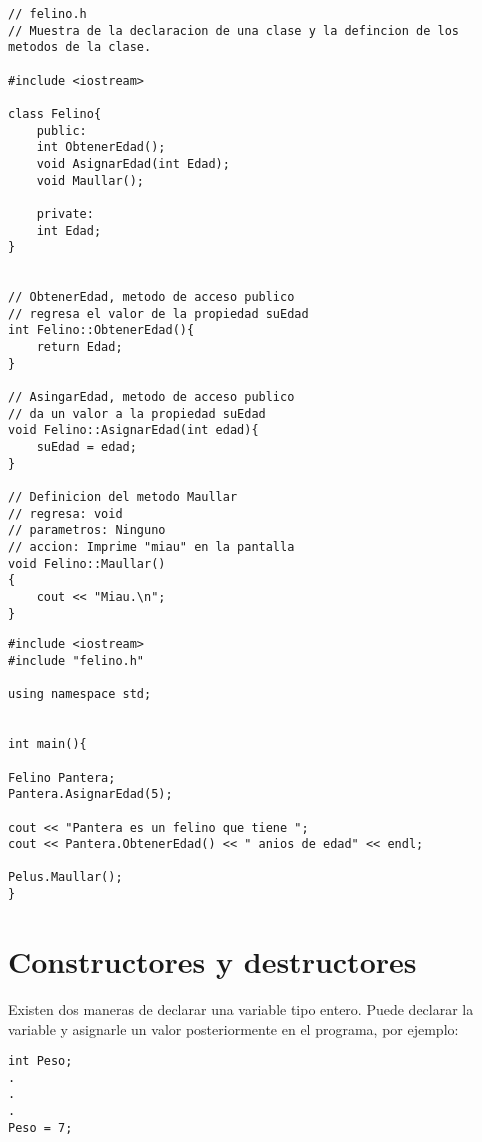 \documentclass[12pt]{extarticle}
\newcommand{\<}{\langle}
\renewcommand{\>}{\rangle}
\theoremstyle{definition}
\begin{document}
\begin{lstlisting}[caption={Archivo donde se encuentra la definición y la implementación de la clase, felino.h},captionpos=b]
// felino.h
// Muestra de la declaracion de una clase y la defincion de los metodos de la clase.

#include <iostream> 

class Felino{
	public:
	int ObtenerEdad();
	void AsignarEdad(int Edad);
	void Maullar();
	
	private:
	int Edad;
}


// ObtenerEdad, metodo de acceso publico
// regresa el valor de la propiedad suEdad
int Felino::ObtenerEdad(){
	return Edad;
}

// AsingarEdad, metodo de acceso publico
// da un valor a la propiedad suEdad
void Felino::AsignarEdad(int edad){
	suEdad = edad;
}

// Definicion del metodo Maullar
// regresa: void
// parametros: Ninguno
// accion: Imprime "miau" en la pantalla
void Felino::Maullar()
{
	cout << "Miau.\n";
}
\end{lstlisting}

\begin{lstlisting}[caption={Función principal, para poder utilizar la clase Felino},captionpos=b]
#include <iostream>
#include "felino.h"

using namespace std;


int main(){

Felino Pantera;
Pantera.AsignarEdad(5);

cout << "Pantera es un felino que tiene ";
cout << Pantera.ObtenerEdad() << " anios de edad" << endl;

Pelus.Maullar(); 
}
\end{lstlisting}



\section{Constructores y destructores}

Existen dos maneras de declarar una variable tipo entero. Puede declarar la variable y asignarle un valor posteriormente en el programa, por ejemplo:\\


\begin{lstlisting}[caption={Declaración de una variable y posteriormente se le asigna un valor},captionpos=b]
int Peso;
.
.
.
Peso = 7; 
\end{lstlisting}
\end{document}

